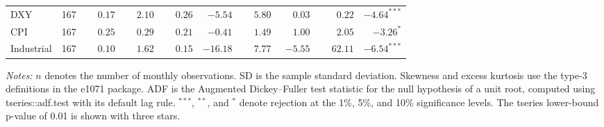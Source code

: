 \begin{table}[H]
\begin{threeparttable}
\begin{tabular}{lrrrrrrrrr}
DXY & 167 & $\phantom{-}0.17$ & $\phantom{-}2.10$ & $\phantom{-}0.26$ & $-5.54$ & $\phantom{-}5.80$ & $\phantom{-}0.03$ & $\phantom{-}0.22$ & $-4.64^{***}$ \\
CPI & 167 & $\phantom{-}0.25$ & $\phantom{-}0.29$ & $\phantom{-}0.21$ & $-0.41$ & $\phantom{-}1.49$ & $\phantom{-}1.00$ & $\phantom{-}2.05$ & $-3.26^{*}$ \\
Industrial & 167 & $\phantom{-}0.10$ & $\phantom{-}1.62$ & $\phantom{-}0.15$ & $-16.18$ & $\phantom{-}7.77$ & $-5.55$ & $\phantom{-}62.11$ & $-6.54^{***}$ \\
\bottomrule
\end{tabular}
\begin{tablenotes}[flushleft]
\footnotesize
\item \textit{Notes:} $n$ denotes the number of monthly observations. SD is the sample standard deviation. Skewness and excess kurtosis use the type-3 definitions in the e1071 package. ADF is the Augmented Dickey--Fuller test statistic for the null hypothesis of a unit root, computed using tseries::adf.test with its default lag rule. $^{***}$, $^{**}$, and $^{*}$ denote rejection at the 1\%, 5\%, and 10\% significance levels. The tseries lower-bound p-value of 0.01 is shown with three stars.
\end{tablenotes}
\end{threeparttable}
\end{table}
